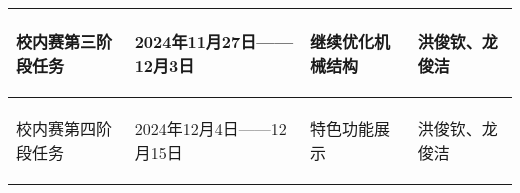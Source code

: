 \begin{longtable}{ p{1.5cm} | p{3cm} | p{6cm} | p{4.3cm} |}
    \hline

    \begin{center}
           校内赛第三阶段任务
       \end{center} &
       \begin{center}
           2024年11月27日——12月3日
       \end{center} &
       \begin{center}
           继续优化机械结构
       \end{center} &
       \begin{center}
           洪俊钦、龙俊洁
       \end{center} \\

    \hline

    \begin{center}
           校内赛第四阶段任务
       \end{center} &
       \begin{center}
           2024年12月4日——12月15日
       \end{center} &
       \begin{center}
           特色功能展示
       \end{center} &
       \begin{center}
           洪俊钦、龙俊洁
       \end{center} \\

    \hline
    
\end{longtable}
